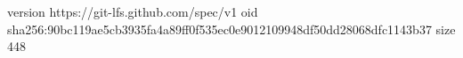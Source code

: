 version https://git-lfs.github.com/spec/v1
oid sha256:90bc119ae5cb3935fa4a89ff0f535ec0e9012109948df50dd28068dfc1143b37
size 448

